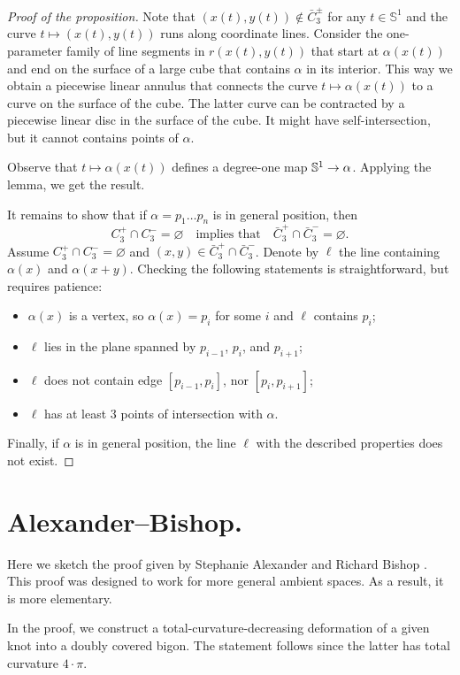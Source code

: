 \documentclass{article}
\newcommand*{\z}[1]{#1\nobreak\discretionary{}%
            {\hbox{$\mathsurround=0pt #1$}}{}}
\theoremstyle{theorem}
\newtheorem{Crofton-type formula}[theorem]{Crofton-type formula}
\newtheorem{Douglas--Rado theorem}[theorem]{Douglas--Rado theorem}
\newtheorem{Extended monotonicity theorem}[theorem]{Extended monotonicity theorem}
\theoremstyle{definition}
\def\emptyset{\varnothing}
\begin{document}
\begin{proof}[Proof of the proposition]
Note that $(x(t),y(t))\notin \bar C_3^\pm$ for any $t\in \mathbb{S}^1$ and the curve $t\mapsto(x(t),y(t))$ runs along coordinate lines.
Consider the one-parameter family of line segments in $r(x(t),y(t))$ that start at $\alpha(x(t))$ and end on the surface of a large cube that contains $\alpha$ in its interior.
This way we obtain a piecewise linear annulus that connects the curve $t\mapsto \alpha(x(t))$ to a curve on the surface of the cube.
The latter curve can be contracted by a piecewise linear disc in the surface of the cube.
It might have self-intersection, but it cannot contains points of $\alpha$.

Observe that $t\mapsto \alpha(x(t))$ defines a degree-one map $\mathbb{S}^1\z\to\alpha$.
Applying the lemma, we get the result.

It remains to show that if $\alpha=p_1\dots p_n$ is in general position, then
\[C_3^+\cap C_3^-=\emptyset\quad\text{implies that}\quad
\bar C_3^+\cap \bar C_3^-=\emptyset.\]
Assume $C_3^+\cap C_3^-=\emptyset$ and $(x,y)\in \bar C_3^+\cap \bar C_3^-$.
Denote by $\ell$ the line containing $\alpha(x)$ and $\alpha(x+y)$.
Checking the following statements is straightforward, but requires patience:
\begin{itemize}
 \item $\alpha(x)$ is a vertex, so $\alpha(x)=p_i$ for some $i$ and $\ell$ contains $p_i$;
 \item $\ell$ lies in the plane spanned by $p_{i-1}$, $p_i$, and $p_{i+1}$; 
 \item $\ell$ does not contain edge $[p_{i-1}, p_i]$, nor $[p_{i}, p_{i+1}]$;
 \item $\ell$ has at least 3 points of intersection with $\alpha$.
\end{itemize}
Finally, if $\alpha$ is in general position,
the line $\ell$ with the described properties does not exist.
\end{proof}

\section{Alexander--Bishop.}

Here we sketch the proof given by Stephanie Alexander and Richard Bishop \cite{alexander-bishop}.
This proof was designed to work for more general ambient spaces.
As a result, it is more elementary.

In the proof, we construct a total-curvature-decreasing deformation of a given knot into a doubly covered
bigon.
The statement follows since the latter has total curvature $4{\cdot}\pi$.
\end{document}
